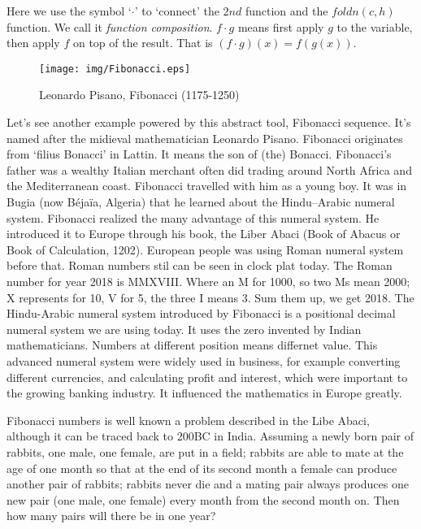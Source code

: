 \documentclass[UTF8]{article}
\begin{document}
Here we use the symbol `$\cdot$' to `connect' the $2nd$ function and the $foldn(c, h)$ function. We call it {\em function composition}. $f\cdot g$ means first apply $g$ to the variable, then apply $f$ on top of the result. That is $(f\cdot g)(x) = f(g(x))$.

\begin{wrapfigure}{R}{0.4\textwidth}
 \centering
 \texttt{[image: img/Fibonacci.eps]}
 \caption{Leonardo Pisano, Fibonacci (1175-1250)}
 \label{fig:abstract-num}
\end{wrapfigure}

Let's see another example powered by this abstract tool, Fibonacci sequence. It's named after the midieval mathematician Leonardo Pisano. Fibonacci originates from `filius Bonacci' in Lattin. It means the son of (the) Bonacci. Fibonacci's father was a wealthy Italian merchant
 often did trading around North Africa and the Mediterranean coast. Fibonacci travelled with him as a young boy. It was in Bugia (now Béjaïa, Algeria) that he learned about the Hindu–Arabic numeral system. Fibonacci realized the many advantage of this numeral system. He introduced it to Europe through his book, the Liber Abaci (Book of Abacus or Book of Calculation, 1202). European people was using Roman numeral system before that. Roman numbers stil can be seen in clock plat today. The Roman number for year 2018 is MMXVIII. Where an M for 1000, so two Ms mean 2000; X represents for 10, V for 5, the three I means 3. Sum them up, we get 2018. The Hindu-Arabic numeral system introduced by Fibonacci is a positional decimal numeral system we are using today. It uses the zero invented by Indian mathematicians. Numbers at different position means differnet value. This advanced numeral system were widely used in business, for example converting different currencies, and calculating profit and interest, which were important to the growing banking industry. It influenced the mathematics in Europe greatly.

Fibonacci numbers is well known a problem described in the Libe Abaci, although it can be traced back to 200BC in India. Assuming a newly born pair of rabbits, one male, one female, are put in a field; rabbits are able to mate at the age of one month so that at the end of its second month a female can produce another pair of rabbits; rabbits never die and a mating pair always produces one new pair (one male, one female) every month from the second month on. Then how many pairs will there be in one year?
\end{document}
